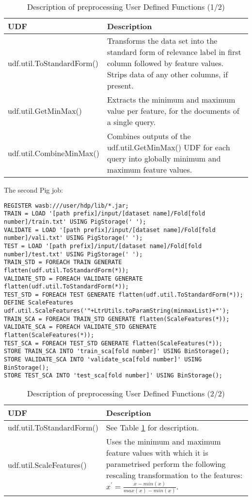 \begin{table}
\centering
\begin{tabular}{p{5cm}p{8cm}}\toprule
UDF & Description \\
\midrule
udf.util.ToStandardForm() & Transforms the data set into the standard form of relevance label in first column followed by feature values. Strips data of any other columns, if present.\\
udf.util.GetMinMax() & Extracts the minimum and maximum value per feature, for the documents of a single query.\\
udf.util.CombineMinMax() & Combines outputs of the udf.util.GetMinMax() UDF for each query into globally minimum and maximum feature values.\\
\bottomrule
\end{tabular}
\caption{Description of preprocessing User Defined Functions (1/2)}
\label{tbl:preprocessing_udfs_1}
\end{table}

The second Pig job:
\begin{lstlisting}
REGISTER wasb:///user/hdp/lib/*.jar;
TRAIN = LOAD '[path prefix]/input/[dataset name]/Fold[fold number]/train.txt' USING PigStorage(' ');
VALIDATE = LOAD '[path prefix]/input/[dataset name]/Fold[fold number]/vali.txt' USING PigStorage(' ');
TEST = LOAD '[path prefix]/input/[dataset name]/Fold[fold number]/test.txt' USING PigStorage(' ');
TRAIN_STD = FOREACH TRAIN GENERATE flatten(udf.util.ToStandardForm(*));
VALIDATE_STD = FOREACH VALIDATE GENERATE flatten(udf.util.ToStandardForm(*));
TEST_STD = FOREACH TEST GENERATE flatten(udf.util.ToStandardForm(*));
DEFINE ScaleFeatures udf.util.ScaleFeatures('"+LtrUtils.toParamString(minmaxList)+"');
TRAIN_SCA = FOREACH TRAIN_STD GENERATE flatten(ScaleFeatures(*));
VALIDATE_SCA = FOREACH VALIDATE_STD GENERATE flatten(ScaleFeatures(*));
TEST_SCA = FOREACH TEST_STD GENERATE flatten(ScaleFeatures(*));
STORE TRAIN_SCA INTO 'train_sca[fold number]' USING BinStorage();
STORE VALIDATE_SCA INTO 'validate_sca[fold number]' USING BinStorage();
STORE TEST_SCA INTO 'test_sca[fold number]' USING BinStorage();
\end{lstlisting}

\begin{table}
\centering
\begin{tabular}{p{5cm}p{8cm}}\toprule
UDF & Description \\
\midrule
udf.util.ToStandardForm() & See Table \ref{tbl:preprocessing_udfs_1} for description.\\
udf.util.ScaleFeatures() & Uses the minimum and maximum feature values with which it is parametrised perform the following rescaling transformation to the features: $x^{'} = \frac{x-min(x)}{max(x)-min(x)}$.\\
\bottomrule
\end{tabular}
\caption{Description of preprocessing User Defined Functions (2/2)}
\label{tbl:preprocessing_udfs_2}
\end{table}